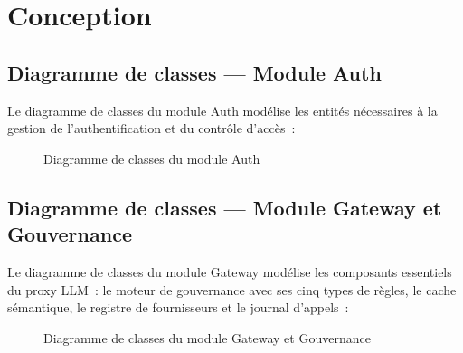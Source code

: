 \section{Conception}
\label{sec:s1_conception}

\subsection{Diagramme de classes --- Module Auth}

Le diagramme de classes du module Auth modélise les entités nécessaires à la gestion de l'authentification et du contrôle d'accès~:

\begin{figure}[H]
    \centering
    \caption{Diagramme de classes du module Auth}
    \label{fig:class_auth}
\end{figure}

\subsection{Diagramme de classes --- Module Gateway et Gouvernance}

Le diagramme de classes du module Gateway modélise les composants essentiels du proxy LLM~: le moteur de gouvernance avec ses cinq types de règles, le cache sémantique, le registre de fournisseurs et le journal d'appels~:

\begin{figure}[H]
    \centering
    \caption{Diagramme de classes du module Gateway et Gouvernance}
    \label{fig:class_gateway}
\end{figure}




